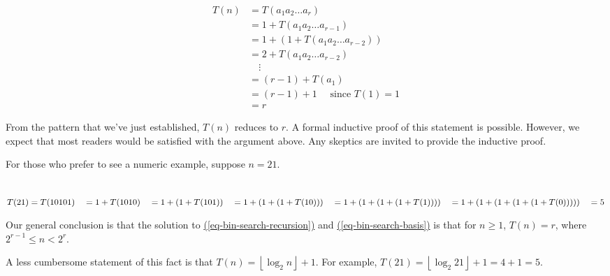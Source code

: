\documentclass[10pt,]{book}
\theoremstyle{plain}
\theoremstyle{definition}
\theoremstyle{definition}
\theoremstyle{definition}
\theoremstyle{definition}
\numberwithin{equation}{section}
\begin{document}
\begin{equation*}
\begin{split}
T(n) &= T\left(a_1a_2\ldots  a_r\right)\\
	& =1+ T\left(a_1a_2\ldots  a_{r-1}\right)\quad \\
	& =1+\left(1+ T\left(a_1a_2\ldots  a_{r-2}\right)\right)\\
	& =2+ T\left(a_1a_2\ldots  a_{r-2}\right)\\
	&\quad  \vdots \\
	& = (r-1) + T\left(a_1\right)\\
	& = (r-1)+1\quad \textrm{ since } T(1)=1\\
	& = r
\end{split}
\end{equation*}%
\par
From the pattern that we've just established, \(T(n)\) reduces to \(r\). A formal inductive proof of this statement is possible. However, we
expect that most readers would be satisfied with the argument above. Any skeptics are invited to provide the inductive proof. %
\par
For those who prefer to see a numeric example, suppose \(n = 21\).

\(\quad \quad \)\(T(21) = T(10101) \\
\\
\quad = 1 + T(1010) \\
\\
\quad = 1 + (1 + T(101)) \\
\\
\quad = 1 + (1 + (1 + T(10))) \\
\\
\quad = 1 + (1 + (1 + (1 + T(1))))\\
\\
\quad = 1 + (1 + (1 + (1 + (1 +T(0)))))\\
\\
\quad = 5\)
%
\par
Our general conclusion is that the solution to \hyperref[eq-bin-search-recursion]{(\ref{eq-bin-search-recursion})}  and \hyperref[eq-bin-search-basis]{(\ref{eq-bin-search-basis})} is that for \(n\geq 1\), \(T(n) = r\), where \(2^{r-1}\leq n < 2^r\).%
\par
A less cumbersome statement of this fact is that \(T(n)=\left\lfloor \log_{2}n\right\rfloor +1\). For example, { }\(T(21) = \left\lfloor \log_2 21\right\rfloor + 1 = 4 + 1 = 5\). %
\typeout{************************************************}
\typeout{************************************************}
\end{document}
